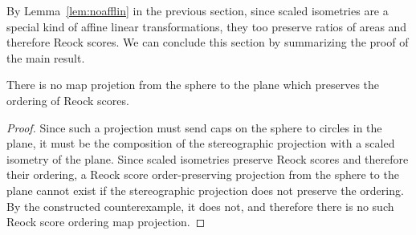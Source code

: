 By Lemma~\ref{lem:noafflin} in the previous section, since scaled
isometries are a special kind of affine linear transformations, they
too preserve ratios of areas and therefore Reock scores.  We can
conclude this section by summarizing the proof of the main result.

\begin{theorem}
  There is no map projetion from the sphere to the plane which preserves the ordering of Reock scores.
\end{theorem}
\begin{proof}
  Since such a projection must send caps on the sphere to circles in the
  plane, it must be the composition of the stereographic projection with
  a scaled isometry of the plane.  Since scaled isometries preserve
  Reock scores and therefore their ordering, a Reock score
  order-preserving projection from the sphere to the plane cannot exist
  if the stereographic projection does not preserve the ordering.  By
  the constructed counterexample, it does not, and therefore there is no
  such Reock score ordering map projection.
\end{proof}
